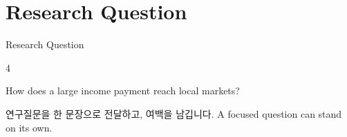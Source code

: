 \documentclass[10pt,aspectratio=169,compress]{beamer}
\begin{document}
\AcademicTitleFrame
\AcademicOutline
\section[Question]{Research Question}
\begin{frame}{Research Question}
  \begin{GridRow}
    \begin{GridCell}{4}
      \vspace{9mm}\centering
      {\fontsize{16}{20}\selectfont How does a large income payment reach local markets?\par}
      \vspace{5mm}
      \ifABKorean 연구질문을 한 문장으로 전달하고, 여백을 남깁니다.\else
      A focused question can stand on its own.\fi
    \end{GridCell}
  \end{GridRow}
\end{frame}
\end{document}
